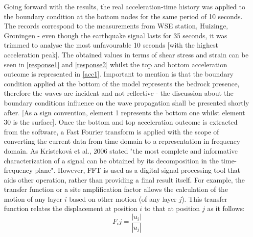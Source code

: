\documentclass[10pt,a4paper]{report}
\begin{document}
Going forward with the results, the real acceleration-time history was applied to the boundary condition at the bottom nodes for the same period of 10 seconds. The records correspond to the measurements from WSE station, Huizinge, Groningen - even though the earthquake signal lasts for 35 seconds, it was trimmed to analyse the most unfavourable 10 seconds [with the highest acceleration peak]. The obtained values in terms of shear stress and strain can be seen in \ref{response1} and \ref{response2}
whilst the top and bottom acceleration outcome is represented in \ref{acc1}. Important to mention is that the boundary condition applied at the bottom of the model represents the bedrock presence, therefore the waves are incident and not reflective - the discussion about the boundary conditions influence on the wave propagation shall be presented shortly after. [As a sign convention, element 1 represents the bottom one whilst element 30 is the surface].
Once the bottom and top acceleration outcome is extracted from the software, a Fast Fourier transform is applied with the scope of converting the current data from time domain to a representation in frequency domain. As Kristeková et al., 2006 stated "the most complete and informative characterization of a signal can be obtained by its decomposition in the time-frequency plane". However, FFT is used as a digital signal processing tool that aids other operation, rather than providing a final result itself. For example, the transfer function or a site amplification factor allows the calculation of the motion of any layer $i$ based on other motion (of any layer $j$). This transfer function relates the displacement at position $i$ to that at position $j$ as it follows:
\begin{equation}
	F_ij=\frac{|u_i|}{|u_j|}
\end{equation}
\end{document}
